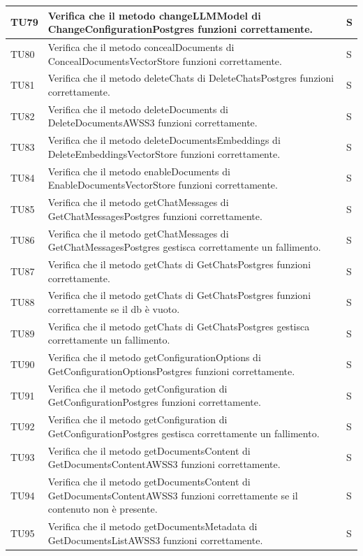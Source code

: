 \documentclass[10pt, a4paper]{article}
\begin{document}
\begin{xltabular}{\textwidth}{p{0.12\textwidth}|p{0.7\textwidth}|X}
\hline
TU79 & Verifica che il metodo changeLLMModel di ChangeConfigurationPostgres funzioni correttamente. & S \\
\hline
TU80 & Verifica che il metodo concealDocuments di ConcealDocumentsVectorStore funzioni correttamente. & S \\
\hline
TU81 & Verifica che il metodo deleteChats di DeleteChatsPostgres funzioni correttamente. & S \\
\hline
TU82 & Verifica che il metodo deleteDocuments di DeleteDocumentsAWSS3 funzioni correttamente. & S \\
\hline
TU83 & Verifica che il metodo deleteDocumentsEmbeddings di DeleteEmbeddingsVectorStore funzioni correttamente. & S \\
\hline
TU84 & Verifica che il metodo enableDocuments di EnableDocumentsVectorStore funzioni correttamente. & S \\
\hline
TU85 & Verifica che il metodo getChatMessages di GetChatMessagesPostgres funzioni correttamente. & S \\
\hline
TU86 & Verifica che il metodo getChatMessages di GetChatMessagesPostgres gestisca correttamente un fallimento. & S \\
\hline
TU87 & Verifica che il metodo getChats di GetChatsPostgres funzioni correttamente. & S \\
\hline
TU88 & Verifica che il metodo getChats di GetChatsPostgres funzioni correttamente se il db è vuoto. & S \\
\hline
TU89 & Verifica che il metodo getChats di GetChatsPostgres gestisca correttamente un fallimento. & S \\
\hline
TU90 & Verifica che il metodo getConfigurationOptions di GetConfigurationOptionsPostgres funzioni correttamente. & S \\
\hline
TU91 & Verifica che il metodo getConfiguration di GetConfigurationPostgres funzioni correttamente. & S \\
\hline
TU92 & Verifica che il metodo getConfiguration di GetConfigurationPostgres gestisca correttamente un fallimento. & S \\
\hline
TU93 & Verifica che il metodo getDocumentsContent di GetDocumentsContentAWSS3 funzioni correttamente. & S \\
\hline
TU94 & Verifica che il metodo getDocumentsContent di GetDocumentsContentAWSS3 funzioni correttamente se il contenuto non è presente. & S \\
\hline
TU95 & Verifica che il metodo getDocumentsMetadata di GetDocumentsListAWSS3 funzioni correttamente. & S \\

\end{xltabular}
\end{document}
